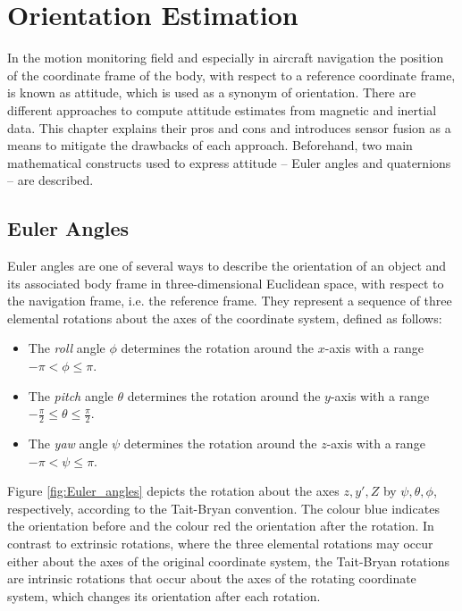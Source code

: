 \chapter{Orientation Estimation}
\label{ch:orientation_estimation}

In the motion monitoring field and especially in aircraft navigation the position of the coordinate frame of the body, with respect to a reference coordinate frame, is known as attitude, which is used as a synonym of orientation. There are different approaches to compute attitude estimates from magnetic and inertial data. This chapter explains their pros and cons and introduces sensor fusion as a means to mitigate the drawbacks of each approach. Beforehand, two main mathematical constructs used to express attitude -- Euler angles and quaternions -- are described.

\section{Euler Angles}

Euler angles are one of several ways to describe the orientation of an object and its associated body frame in three-dimensional Euclidean space, with respect to the navigation frame, i.e. the reference frame. They represent a sequence of three elemental rotations about the axes of the coordinate system, defined as follows:

\begin{itemize}
\item The \emph{roll} angle $\phi$ determines the rotation around the $x$-axis with a range $-\pi < \phi \leq \pi$.
\item The \emph{pitch} angle $\theta$ determines the rotation around the $y$-axis with a range $-\frac{\pi}{2} \leq \theta \leq \frac{\pi}{2}$.
\item The \emph{yaw} angle $\psi$ determines the rotation around the $z$-axis with a range $-\pi < \psi \leq \pi$.
\end{itemize}

\noindent
Figure \ref{fig:Euler_angles} depicts the rotation about the axes $z, y', Z$ by $\psi, \theta, \phi$, respectively, according to the Tait-Bryan convention. The colour blue indicates the orientation before and the colour red the orientation after the rotation. In contrast to extrinsic rotations, where the three elemental rotations may occur either about the axes of the original coordinate system, the Tait-Bryan rotations are intrinsic rotations that occur about the axes of the rotating coordinate system, which changes its orientation after each rotation.

